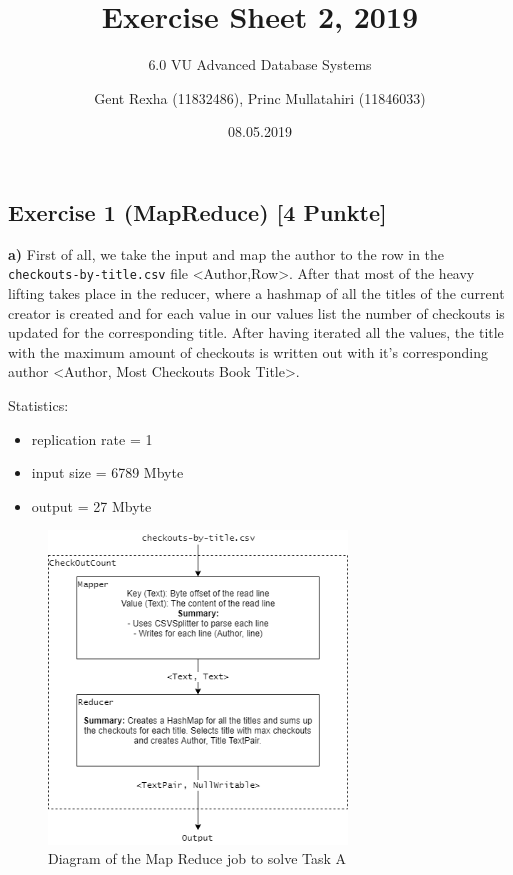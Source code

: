 \documentclass[]{article}
\title{Exercise Sheet 2, 2019}
\subtitle{6.0 VU Advanced Database Systems}
\author{Gent Rexha (11832486), Princ Mullatahiri (11846033)}
\date{08.05.2019}
\providecommand{\tightlist}{%
  \setlength{\itemsep}{0pt}\setlength{\parskip}{0pt}}
\begin{document}
\maketitle

\hypertarget{exercise-1-mapreduce-4-punkte}{%
\subsection{Exercise 1 (MapReduce) {[}4
Punkte{]}}\label{exercise-1-mapreduce-4-punkte}}

\textbf{a)} First of all, we take the input and map the author to the
row in the \texttt{checkouts-by-title.csv} file
\textless{}Author,Row\textgreater{}. After that most of the heavy
lifting takes place in the reducer, where a hashmap of all the titles of
the current creator is created and for each value in our values list the
number of checkouts is updated for the corresponding title. After having
iterated all the values, the title with the maximum amount of checkouts
is written out with it's corresponding author \textless{}Author, Most
Checkouts Book Title\textgreater{}.

Statistics:

\begin{itemize}
\tightlist
\item
  replication rate = 1
\item
  input size = 6789 Mbyte
\item
  output = 27 Mbyte
\end{itemize}

\begin{figure}[h]

{\centering \includegraphics[width=300px]{images/Exercise_1_Task_A} 

}

\caption{\label{fig:figs}Diagram of the Map Reduce job to solve Task A}\label{fig:unnamed-chunk-1}
\end{figure}
\end{document}
